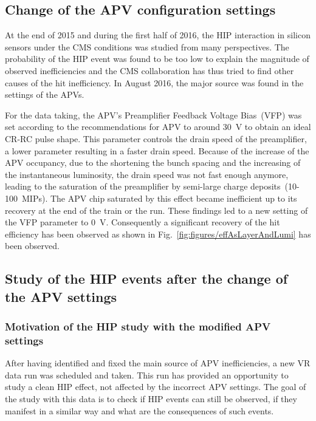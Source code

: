 
\subsection{Change of the APV configuration settings~\label{sec:APVchange}}

At the end of 2015 and during the first half of 2016, the HIP interaction in silicon sensors under the CMS conditions was studied from many perspectives. The probability of the HIP event was found to be too low to explain the magnitude of observed inefficiencies and the CMS collaboration has thus tried to find other causes of the hit inefficiency. In August 2016, the major source was found in the settings of the APVs.

For the data taking, the APV's Preamplifier Feedback Voltage Bias~(VFP) was set according to the recommendations for APV to around 30~V to obtain an ideal CR-RC pulse shape. This parameter controls the drain speed of the preamplifier, a lower parameter resulting in a faster drain speed. Because of the increase of the APV occupancy, due to the shortening the bunch spacing and the increasing of the instantaneous luminosity, the drain speed was not fast enough anymore, leading to the saturation of the preamplifier by semi-large charge deposits~(10-100~MIPs). The APV chip saturated by this effect became inefficient up to its recovery at the end of the train or the run. These findings led to a new setting of the VFP parameter to 0~V. Consequently a significant recovery of the hit efficiency has been observed as shown in Fig.~\ref{fig:figures/effAsLayerAndLumi} has been observed.


\subsection{Study of the HIP events after the change of the APV settings~\label{sec:secondStudy}}

\subsubsection{Motivation of the HIP study with the modified APV settings}

After having identified and fixed the main source of APV inefficiencies, a new VR data run was scheduled and taken. This run has provided an opportunity to study a clean HIP effect, not affected by the incorrect APV settings. The goal of the study with this data is to check if HIP events can still be observed, if they manifest in a similar way and what are the consequences of such events.

